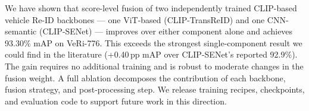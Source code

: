 \documentclass{ieeeaccess}
\newcommand{\ourmap}{93.30}
\begin{document}
We have shown that score-level fusion of two independently trained
CLIP-based vehicle Re-ID backbones --- one ViT-based (CLIP-TransReID)
and one CNN-semantic (CLIP-SENet) --- improves over either component
alone and achieves \ourmap\% mAP on VeRi-776.
This exceeds the strongest single-component result we could find
in the literature (+0.40\,pp mAP over CLIP-SENet's reported 92.9\%).
The gain requires no additional training and is robust to moderate
changes in the fusion weight.
A full ablation decomposes the contribution of each backbone,
fusion strategy, and post-processing step.
We release training recipes, checkpoints, and evaluation code to
support future work in this direction.



\end{document}
